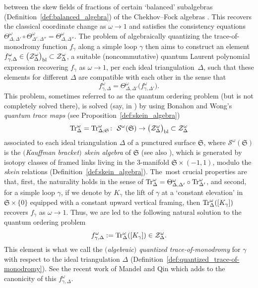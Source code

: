 \documentclass[pdftex]{sigma}
\numberwithin{equation}{section}
\theoremstyle{definition}
\begin{document}
between the skew fields of fractions of certain `balanced' subalgebras (Definition~\ref{def:balanced_algebra}) of the Chekhov--Fock algebras \cite{BL07, F97, CF, FG09, Hiatt, KLS}. This recovers the classical coordinate change as $\omega\to 1$ and satisfies the consistency equations $\Theta^\omega_{\Delta,\Delta'} \circ \Theta^\omega_{\Delta',\Delta''} = \Theta^\omega_{\Delta,\Delta''}$.
The problem of algebraically quantizing the trace-of-monodromy function $f_\gamma$ along a simple loop $\gamma$ then aims to construct an element $f^\omega_{\gamma,\Delta} \in \bigl(\mathcal{Z}^\omega_\Delta\bigr)_{\rm bl} \subset \mathcal{Z}^\omega_\Delta$, a suitable (noncommutative) quantum Laurent polynomial expression recovering $f_{\gamma}$ as $\omega\to 1$, per each ideal triangulation~$\Delta$, such that these elements for different $\Delta$ are compatible with each other in the sense that
\[
f^\omega_{\gamma,\Delta} = \Theta^\omega_{\Delta,\Delta'} \bigl(f^\omega_{\gamma,\Delta'}\bigr).
\]
This problem, sometimes referred to as the quantum ordering problem \cite{CF2} (but is not completely solved there), is solved (say, in \cite{AK}) by using Bonahon and Wong's {\em quantum trace maps} \cite{BW, Le19} (see Proposition~\ref{def:skein_algebra})
\[
{\rm Tr}^\omega_\Delta = {\rm Tr}^\omega_{\Delta;\mathfrak{S}} \colon \ \mathcal{S}^\omega(\mathfrak{S}) \to \bigl(\mathcal{Z}^\omega_\Delta\bigr)_{\rm bl} \subset \mathcal{Z}^\omega_\Delta
\]
associated to each ideal triangulation $\Delta$ of a punctured surface $\mathfrak{S}$, where $\mathcal{S}^\omega(\mathfrak{S})$ is the {\em $($Kauffman bracket$)$ skein algebra} of $\mathfrak{S}$ \cite{Pr,Turaev} (see also \cite{Muller}), which is generated by isotopy classes of framed links living in the 3-manifold $\mathfrak{S} \times (-1,1)$, modulo the {\em skein} relations (Definition~\ref{def:skein_algebra}). The~most crucial properties are that, first, the naturality holds in the sense of ${\rm Tr}^\omega_\Delta = \Theta^\omega_{\Delta,\Delta'} \circ {\rm Tr}^\omega_{\Delta'}$, and second, for a simple loop $\gamma$, if we denote by $K_\gamma$ the lift of $\gamma$ at a `constant elevation' in $\mathfrak{S} \times \{0\}$ equipped with a constant upward vertical framing, then ${\rm Tr}^\omega_\Delta([K_\gamma])$ recovers $f_\gamma$ as $\omega\to 1$. Thus, we are led to the following natural solution to the quantum ordering problem
\[
f^\omega_{\gamma,\Delta} := {\rm Tr}^\omega_\Delta([K_\gamma]) \in \mathcal{Z}^\omega_\Delta.
\]
This element is what we call the {\em $($algebraic$)$ quantized trace-of-monodromy} for $\gamma$ with respect to the ideal triangulation $\Delta$ (Definition~\ref{def:quantized_trace-of-monodromy}). See the recent work of Mandel and Qin \cite{MQ} which adds to the canonicity of this $f^\omega_{\gamma,\Delta}$.
\end{document}
